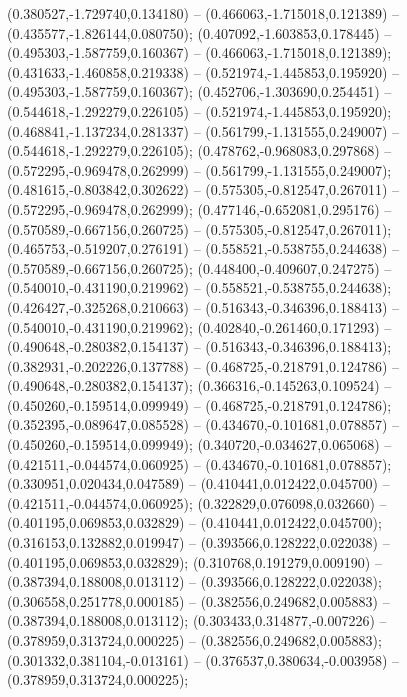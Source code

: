  (0.380527,-1.729740,0.134180) -- (0.466063,-1.715018,0.121389) -- (0.435577,-1.826144,0.080750);
 (0.407092,-1.603853,0.178445) -- (0.495303,-1.587759,0.160367) -- (0.466063,-1.715018,0.121389);
 (0.431633,-1.460858,0.219338) -- (0.521974,-1.445853,0.195920) -- (0.495303,-1.587759,0.160367);
 (0.452706,-1.303690,0.254451) -- (0.544618,-1.292279,0.226105) -- (0.521974,-1.445853,0.195920);
 (0.468841,-1.137234,0.281337) -- (0.561799,-1.131555,0.249007) -- (0.544618,-1.292279,0.226105);
 (0.478762,-0.968083,0.297868) -- (0.572295,-0.969478,0.262999) -- (0.561799,-1.131555,0.249007);
 (0.481615,-0.803842,0.302622) -- (0.575305,-0.812547,0.267011) -- (0.572295,-0.969478,0.262999);
 (0.477146,-0.652081,0.295176) -- (0.570589,-0.667156,0.260725) -- (0.575305,-0.812547,0.267011);
 (0.465753,-0.519207,0.276191) -- (0.558521,-0.538755,0.244638) -- (0.570589,-0.667156,0.260725);
 (0.448400,-0.409607,0.247275) -- (0.540010,-0.431190,0.219962) -- (0.558521,-0.538755,0.244638);
 (0.426427,-0.325268,0.210663) -- (0.516343,-0.346396,0.188413) -- (0.540010,-0.431190,0.219962);
 (0.402840,-0.261460,0.171293) -- (0.490648,-0.280382,0.154137) -- (0.516343,-0.346396,0.188413);
 (0.382931,-0.202226,0.137788) -- (0.468725,-0.218791,0.124786) -- (0.490648,-0.280382,0.154137);
 (0.366316,-0.145263,0.109524) -- (0.450260,-0.159514,0.099949) -- (0.468725,-0.218791,0.124786);
 (0.352395,-0.089647,0.085528) -- (0.434670,-0.101681,0.078857) -- (0.450260,-0.159514,0.099949);
 (0.340720,-0.034627,0.065068) -- (0.421511,-0.044574,0.060925) -- (0.434670,-0.101681,0.078857);
 (0.330951,0.020434,0.047589) -- (0.410441,0.012422,0.045700) -- (0.421511,-0.044574,0.060925);
 (0.322829,0.076098,0.032660) -- (0.401195,0.069853,0.032829) -- (0.410441,0.012422,0.045700);
 (0.316153,0.132882,0.019947) -- (0.393566,0.128222,0.022038) -- (0.401195,0.069853,0.032829);
 (0.310768,0.191279,0.009190) -- (0.387394,0.188008,0.013112) -- (0.393566,0.128222,0.022038);
 (0.306558,0.251778,0.000185) -- (0.382556,0.249682,0.005883) -- (0.387394,0.188008,0.013112);
 (0.303433,0.314877,-0.007226) -- (0.378959,0.313724,0.000225) -- (0.382556,0.249682,0.005883);
 (0.301332,0.381104,-0.013161) -- (0.376537,0.380634,-0.003958) -- (0.378959,0.313724,0.000225);
